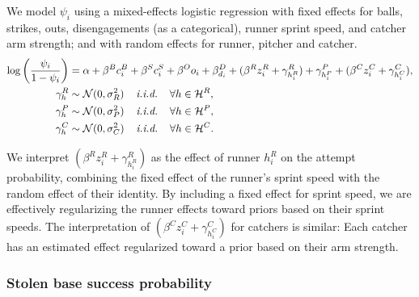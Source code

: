 \documentclass{article}
\begin{document}
        We model $\psi_i$ using a mixed-effects logistic regression with fixed effects for balls, strikes, outs, disengagements (as a categorical), runner sprint speed, and catcher arm strength; and with random effects for runner, pitcher and catcher.
        \begin{align}
          \label{eqn:prob-sb-attempt}
          \begin{split}
            \log\left(\frac{\psi_i}{1 - \psi_i}\right) &= \alpha + \beta^B c_i^B + \beta^S c_i^S + \beta^O o_i + \beta^D_{d_i} + (\beta^R z_i^R + \gamma^R_{h_i^R}) + \gamma^P_{h_i^P} + (\beta^C z_i^C + \gamma^C_{h_i^C}),\\
            \gamma^R_{h} &\sim \mathcal{N}(0, \sigma^2_R) \hspace{4mm} \mbox{\it i.i.d.} \hspace{4mm} \forall h \in \mathcal{H}^R,\\
            \gamma^P_{h} &\sim \mathcal{N}(0, \sigma^2_P) \hspace{4mm} \mbox{\it i.i.d.} \hspace{4mm} \forall h \in \mathcal{H}^P,\\
            \gamma^C_{h} &\sim \mathcal{N}(0, \sigma^2_C) \hspace{4mm} \mbox{\it i.i.d.} \hspace{4mm} \forall h \in \mathcal{H}^C.
          \end{split}
        \end{align}
 
        We interpret $(\beta^R z_i^R + \gamma^R_{h_i^R})$ as the effect of runner $h_i^R$ on the attempt probability, combining the fixed effect of the runner's sprint speed with the random effect of their identity. By including a fixed effect for sprint speed, we are effectively regularizing the runner effects toward priors based on their sprint speeds. The interpretation of $(\beta^C z_i^C + \gamma^C_{h_i^C})$ for catchers is similar: Each catcher has an estimated effect regularized toward a prior based on their arm strength.
      
      \subsubsection{Stolen base success probability}
      \label{sec:prob-so-success}
\end{document}
